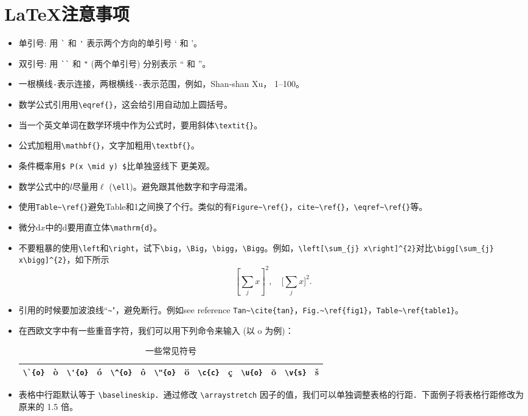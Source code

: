 \documentclass[11pt,final]{article}
\numberwithin{equation}{section}
\begin{document}
\section{\LaTeX 注意事项}
\begin{itemize}
\item 单引号: 用 \verb|`| 和 \verb|'| 表示两个方向的单引号 ` 和 '。
\item 双引号: 用 \verb|``| 和 \verb|"| (两个单引号) 分别表示 `` 和 ''。
\item 一根横线\verb|-|表示连接，两根横线\verb|--|表示范围，例如，Shan-shan Xu， 1--100。
\item 数学公式引用用\verb|\eqref{}|，这会给引用自动加上圆括号。
\item 当一个英文单词在数学环境中作为公式时，要用斜体\verb|\textit{}|。
\item 公式加粗用\verb|\mathbf{}|，文字加粗用\verb|\textbf{}|。
\item 条件概率用\verb|$ P(x \mid y) $|比单独竖线下 更美观。
\item 数学公式中的$ l $尽量用$ \ell $ (\verb|\ell|)。避免跟其他数字和字母混淆。
\item  使用\verb|Table~\ref{}|避免Table和1之间换了个行。类似的有\verb|Figure~\ref{}|，\verb|cite~\ref{}|，\verb|\eqref~\ref{}|等。
\item 微分$ \mathrm{d}x $中的$ \mathrm{d} $要用直立体\verb|\mathrm{d}|。
\item 不要粗暴的使用\verb|\left|和\verb|\right|，试下\verb|\big|，\verb|\Big|，\verb|\bigg|，\verb|\Bigg|。例如，\verb|\left[\sum_{j} x\right]^{2}|对比\verb|\bigg[\sum_{j} x\bigg]^{2}|，如下所示
\begin{equation*}
\left[\sum_{j} x\right]^{2},\quad
\bigg[\sum_{j}x\bigg]^{2}.
\end{equation*}
\item 引用的时候要加波浪线``\verb|~|"，避免断行。例如see reference \verb|Tan~\cite{tan}|，\verb|Fig.~\ref{fig1}|，\verb|Table~\ref{table1}|。
\item 在西欧文字中有一些重音字符，我们可以用下列命令来输入 (以 o 为例)：
\begin{table}[h]
	\centering
	\caption{一些常见符号}
	\begin{tabular}{|rl|rl|rl|rl|rl|rl|rl|}
		\hline 
		\verb|\`{o}| &\`{o}   &\verb|\'{o}|  &\'{o} & \verb|\^{o}| &\^{o} & \verb|\"{o}|& \"{o} & \verb|\c{c}|& \c{c} & \verb|\u{o}|& \u{o} & \verb|\v{s}| & \v{s}\\ 
 
		\hline 
	\end{tabular} 
\end{table}
\item 表格中行距默认等于 \verb|\baselineskip|．通过修改 \verb|\arraystretch| 因子的值，我们可以单独调整表格的行距．下面例子将表格行距修改为原来的 1.5 倍。


\end{itemize}
\end{document}
